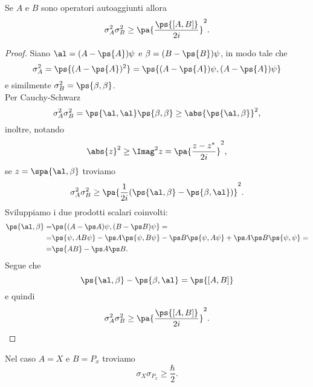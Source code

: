 \begin{theorem}
Se $A$ e $B$ sono operatori autoaggiunti allora
\[\sigma_A^2\sigma_B^2\geq\pa{\frac{\ps{[A,B]}}{2i}}^2.\]
\end{theorem}
\begin{proof}
Siano $\al=(A-\ps{A})\psi$ e $\beta=(B-\ps{B})\psi$, in modo tale che 
\[\sigma_A^2=\ps{(A-\ps{A})^2}=\ps{(A-\ps{A})\psi,(A-\ps{A})\psi}\]
e similmente $\sigma_B^2=\ps{\beta,\beta}$.\\
Per Cauchy-Schwarz
\[\sigma_A^2\sigma_B^2=\ps{\al,\al}\ps{\beta,\beta}\geq\abs{\ps{\al,\beta}}^2,\]
inoltre, notando
\[\abs{z}^2\geq \Imag^2z=\pa{\frac{z-z^\ast}{2i}}^2,\]
se $z=\spa{\al,\beta}$ troviamo
\[\sigma_A^2\sigma_B^2\geq\pa{\frac1{2i}(\ps{\al,\beta}-\ps{\beta,\al})}^2.\]
Sviluppiamo i due prodotti scalari coinvolti:
\begin{align*}
\ps{\al,\beta}=&\ps{(A-\ps A)\psi,(B-\ps B)\psi}=\\
=&\ps{\psi,AB\psi}-\ps A\ps{\psi,B\psi}-\ps B\ps{\psi,A\psi}+\ps A\ps B\ps{\psi,\psi}=\\
=&\ps{AB}-\ps A\ps B.
\end{align*}
Segue che
\[\ps{\al,\beta}-\ps{\beta,\al}=\ps{[A,B]}\]
e quindi
\[\sigma_A^2\sigma_B^2\geq\pa{\frac{\ps{[A,B]}}{2i}}^2.\]
\end{proof}
\begin{corollary}
Nel caso $A=X$ e $B=P_x$ troviamo
\[\sigma_X\sigma_{P_x}\geq\frac\hbar2.\]
\end{corollary}